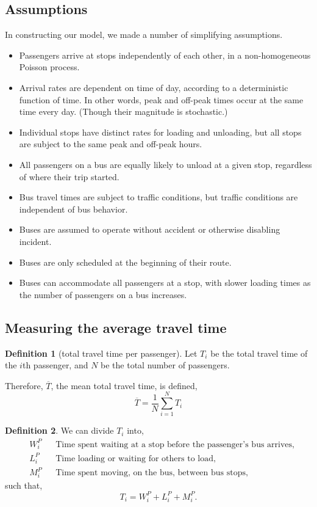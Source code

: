 \documentclass[12pt]{article}
\theoremstyle{definition}
\newtheorem{definition}{Definition}
\begin{document}
\subsection{Assumptions}
In constructing our model, we made a number of simplifying assumptions.
\begin{itemize}
    \item Passengers arrive at stops independently of each other, in
        a non-homogeneous Poisson process.
    \item Arrival rates are dependent on time of day, according to a
        deterministic function of time. In other words, peak and off-peak
        times occur at the same time every day. (Though their magnitude is
        stochastic.)
    \item Individual stops have distinct rates for loading and unloading, but
        all stops are subject to the same peak and off-peak hours.
    \item All passengers on a bus are equally likely to unload at a given
        stop, regardless of where their trip started.
    \item Bus travel times are subject to traffic conditions, but traffic
        conditions are independent of bus behavior.
    \item Buses are assumed to operate without accident or otherwise disabling
        incident.
    \item Buses are only scheduled at the beginning of their route.
    \item Buses can accommodate all passengers at a stop, with slower loading
        times as the number of passengers on a bus increases.
\end{itemize}

\subsection{Measuring the average travel time}

\begin{definition}[total travel time per passenger]
    \hfill\par\nopagebreak
    Let $T_i$ be the total travel time of the $i$th passenger, and $N$ be the
    total number of passengers.

    Therefore, $\overline{T}$, the mean total travel time, is defined,
    \[
        \overline{T} = \frac{1}{N}\sum_{i=1}^N T_i
    \]
\end{definition}

\begin{definition}
    \hfill\par\nopagebreak
    We can divide $T_i$ into,
    \begin{align*}
        &W^P_i&
        &\text{Time spent waiting at a stop before the passenger's bus
        arrives,}\\
        &L^P_i&
        &\text{Time loading or waiting for others to load,}\\
        &M^P_i&
        &\text{Time spent moving, on the bus, between bus stops,}
    \end{align*}
    such that,
    \[
        T_i = W^P_i + L^P_i + M^P_i.
    \]
\end{definition}
\end{document}
